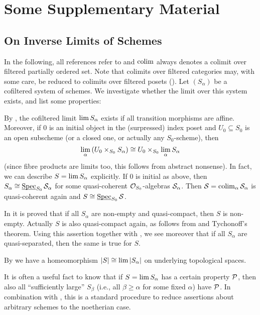 \chapter{Some Supplementary Material}

\section{On Inverse Limits of Schemes}\label{sec:inverseLimits}
In the following, all references refer to \cite{stacks-project} and $\operatorname*{colim}$ always denotes a colimit over filtered partially ordered set. Note that colimits over filtered categories may, with some care, be reduced to colimits over filtered posets ().
\label{par:schemesInverseLimit}Let $(S_\alpha)$ be a cofiltered system of schemes. We investigate whether the limit over this system exists, and list some properties:
\begin{alphanumerate}
	\item By , the cofiltered limit $\operatorname*{lim} S_\alpha$ exists if all transition morphisms are affine. Moreover, if $0$ is an initial object in the (surpressed) index poset and $U_0\subseteq S_0$ is an open subscheme (or a closed one, or actually any $S_0$-scheme), then
	\begin{equation*}
	\operatorname*{lim}_\alpha \left(U_0\times_{S_0}S_\alpha\right)\cong U_0\times_{S_0}\operatorname*{lim}_\alpha S_\alpha
	\end{equation*}
	(since fibre products are limits too, this follows from abstract nonsense). In fact, we can describe $S=\operatorname*{lim} S_\alpha$ explicitly. If $0$ is initial as above, then $S_\alpha\cong \operatorname{\underline{\smash{\mathrm{Spec}}}}_{S_0}\mathcal{S}_\alpha$ for some quasi-coherent $\mathcal{O}_{S_0}$-algebras $\mathcal{S}_\alpha$. Then $\mathcal{S}=\operatorname*{colim}_\alpha \mathcal{S}_\alpha$ is quasi-coherent again and $S\cong \operatorname{\underline{\smash{\mathrm{Spec}}}}_{S_0}\mathcal{S}$.
	\item In  it is proved that if all $S_\alpha$ are non-empty and quasi-compact, then $S$ is non-empty. Actually $S$ is also quasi-compact again, as follows from  and Tychonoff's theorem. Using this assertion together with , we see moreover that if all $S_\alpha$ are quasi-separated, then the same is true for $S$.
	\item By  we have a homeomorphism $|S|\cong \operatorname*{lim} |S_\alpha|$ on underlying topological spaces.
\end{alphanumerate}
\label{par:descendingObjects}It is often a useful fact to know that if $S=\operatorname*{lim} S_\alpha$ has a certain property $\mathcal{P}$, then also all \enquote{sufficiently large} $S_\beta$ (i.e., all $\beta\geq \alpha$ for some fixed $\alpha$) have $\mathcal{P}$. In combination with , this is a standard procedure to reduce assertions about arbitrary schemes to the noetherian case.
